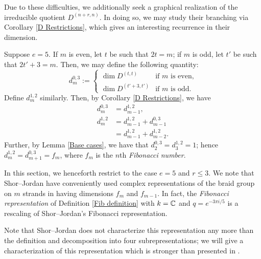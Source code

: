 \documentclass{amsart}
\begin{document}
Due to these difficulties, we additionally seek a graphical realization of the irreducible quotient $D^{(n+r,n)}$.
In doing so, we may study their branching via Corollary \ref{D Restrictions}, which gives an interesting recurrence in their dimension. 
\begin{example}
Suppose $e = 5$. 
If $m$ is even, let $t$ be such that $2t = m$;
if $m$ is odd, let $t'$ be such that $2t' + 3 = m$.
Then, we may define the following quantity:
\[
  d_{m}^{0,3} := \begin{cases}
    \dim D^{(t,t)} & \text{if } m \text{ is even,}\\
    \dim D^{(t'+3,t')} & \text{if } m \text{ is odd.}
  \end{cases}
\]
Define $d_m^{1,2}$ similarly.
Then, by Corollary \ref{D Restrictions}, we have
\begin{align*}
    d_m^{0,3} &= d_{m-1}^{1,2},\\
    d_m^{1,2} &= d_{m-1}^{1,2} + d_{m-1}^{0,3}\\
    &= d_{m-1}^{1,2} + d_{m-2}^{1,2}.
\end{align*}
Further, by Lemma \ref{Base cases}, we have that $d_2^{0,3} = d_3^{1,2} = 1$;
hence $d_m^{1,2} = d_{m+1}^{0,3} = f_m$, where $f_m$ is the $n$th \emph{Fibonacci number}.
\end{example}

In this section, we henceforth restrict to the case $e = 5$ and $r \leq 3$.
We note that Shor--Jordan \cite{Shor} have conveniently used complex representations of the braid group on $m$ strands in \cite{Shor} having dimensions $f_m$ and $f_{m-1}$.
In fact, the \emph{Fibonacci representation} of Definition \ref{Fib definition} with $k = \mathbb{C}$ and $q = e^{-3\pi i /5}$ is a rescaling of Shor--Jordan's Fibonacci representation.

Note that Shor--Jordan does not characterize this representation any more than the definition and decomposition into four subrepresentations;
we will give a characterization of this representation which is stronger than presented in \cite{Shor}.
\end{document}
